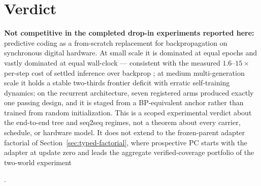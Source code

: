 \documentclass[11pt]{article}
\newif\ifoeisterminalfacts
\begin{document}
\section{Verdict}
\label{sec:verdict}

\textbf{Not competitive in the completed drop-in experiments reported here:}
predictive coding as a from-scratch replacement for backpropagation on synchronous
digital hardware. At small scale it is dominated at equal epochs and vastly dominated at
equal wall-clock --- consistent with the measured $1.6$--$15\times$ per-step cost of
settled inference over backprop \cite{rosenbaum2022}; at medium multi-generation scale it
holds a stable two-thirds frontier deficit with erratic self-training dynamics; on the recurrent architecture, seven
registered arms produced exactly one passing design, and it is staged from a
BP-equivalent anchor rather than trained from random initialization. This is a scoped
experimental verdict about the end-to-end tree and seq2seq regimes, not a theorem about
every carrier, schedule, or hardware model. It does not extend to the frozen-parent
adapter factorial of Section~\ref{sec:typed-factorial}, where prospective PC starts with
the adapter at update zero and leads the aggregate verified-coverage portfolio of the
two-world experiment%
\ifoeisterminalfacts
\ ---though not of the mis-specified single-world branch recorded in
Section~\ref{sec:pc-terminal}, where the independent-BP opportunity control has the
largest single-arm coverage ($400$); that branch is footnoted as botched and carries
no evidential weight on the from-scratch question%
\fi
.
\end{document}
